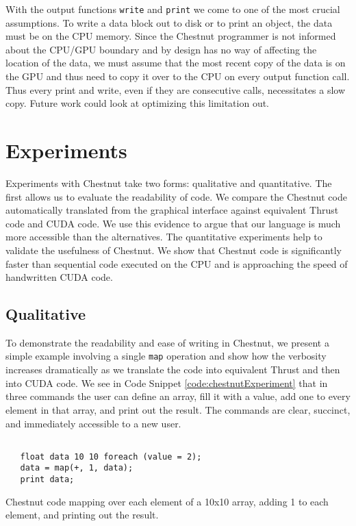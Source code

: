 \documentclass[twocolumn]{article}
\renewcommand{\|}{\origbar} %
\newcommand{\code}[1]{\texttt{#1}}
\begin{document}
With the output functions \code{write} and \code{print} we come to one of the most crucial assumptions. To write a data block out to disk or to print an object, the data must be on the CPU memory. Since the Chestnut programmer is not informed about the CPU/GPU boundary and by design has no way of affecting the location of the data, we must assume that the most recent copy of the data is on the GPU and thus need to copy it over to the CPU on every output function call. Thus every print and write, even if they are consecutive calls, necessitates a slow copy. Future work could look at optimizing this limitation out. 


\section{Experiments}


Experiments with Chestnut take two forms: qualitative and quantitative. The first allows us to evaluate the readability of code. We compare the Chestnut code automatically translated from the graphical interface against equivalent Thrust code and CUDA code. We use this evidence to argue that our language is much more accessible than the alternatives. The quantitative experiments help to validate the usefulness of Chestnut. We show that Chestnut code is significantly faster than sequential code executed on the CPU and is approaching the speed of handwritten CUDA code.

\subsection{Qualitative}

To demonstrate the readability and ease of writing in Chestnut, we present a simple example involving a single \code{map} operation and show how the verbosity increases dramatically as we translate the code into equivalent Thrust and then into CUDA code. We see in Code Snippet \ref{code:chestnutExperiment} that in three commands the user can define an array, fill it with a value, add one to every element in that array, and print out the result. The commands are clear, succinct, and immediately accessible to a new user. 

\begin{Code Snippet}
\begin{verbatim}

   float data 10 10 foreach (value = 2);
   data = map(+, 1, data);
   print data;
\end{verbatim}
\caption{Chestnut code mapping over each element of a 10x10 array, adding 1 to each element, and printing out the result.}
\label{code:chestnutExperiment}
\end{Code Snippet}
\end{document}
